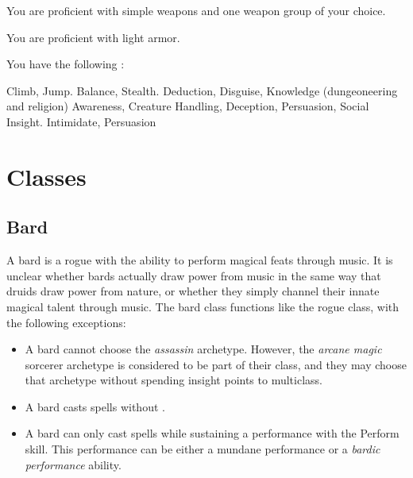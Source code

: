             You are proficient with simple weapons and one weapon group of your choice.

            You are proficient with light armor.

            You have the following :
            \begin{itemize}
                 Climb, Jump.
                 Balance, Stealth.
                 Deduction, Disguise, Knowledge (dungeoneering and religion)
                 Awareness, Creature Handling, Deception, Persuasion, Social Insight.
                 Intimidate, Persuasion
            \end{itemize}

\section{Classes}
    \subsection{Bard}
        A bard is a rogue with the ability to perform magical feats through music.
        It is unclear whether bards actually draw power from music in the same way that druids draw power from nature, or whether they simply channel their innate magical talent through music.
        The bard class functions like the rogue class, with the following exceptions:
        \begin{itemize}
            \item A bard cannot choose the \textit{assassin} archetype. However, the \textit{arcane magic} sorcerer archetype is considered to be part of their class, and they may choose that archetype without spending insight points to multiclass.
            \item A bard casts spells without .
            \item A bard can only cast spells while sustaining a performance with the Perform skill. This performance can be either a mundane performance or a \textit{bardic performance} ability.
        \end{itemize}

